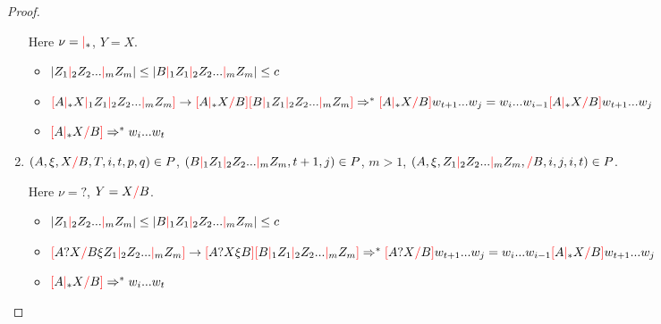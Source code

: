 \documentclass[12pt]{extarticle}
\theoremstyle{definition} \newtheorem{defn}{Definition}
\theoremstyle{definition} \newtheorem{prop}{Proposition}
\newcommand{\rc}{\textcolor{red}{/}}
\newcommand{\mc}{\textcolor{red}{|}}
\newcommand{\lb}{\textcolor{red}{[}}
\newcommand{\rb}{\textcolor{red}{]}}
\begin{document}
\begin{proof}
\begin{enumerate}
        Here $\nu = \mc_*$, $Y = X$.
        \begin{itemize}
            \item $|Z_1 \mc_2 Z_2 ... \mc_m Z_m| \leq |B \mc_1 Z_1 \mc_2 Z_2 ... \mc_m Z_m| \leq c$
            \item $
                \lb A \mc_* X \mc_1 Z_1 \mc_2 Z_2 ... \mc_m Z_m \rb
                \rightarrow
                \lb A \mc_* X \rc B \rb \lb B \mc_1 Z_1 \mc_2 Z_2 ... \mc_m Z_m \rb
                \\
                \Rightarrow^* \lb A \mc_* X \rc B \rb w_{t + 1} ... w_j
                = w_i ... w_{i - 1} \lb A \mc_* X \rc B \rb w_{t + 1} ... w_j
                $
            \item $\lb A \mc_* X \rc B \rb \Rightarrow^* w_i ... w_t$
        \end{itemize}

    \item $(A, \xi, X \rc B, T, i, t, p, q) \in P$,
        $(B \mc_1 Z_1 \mc_2 Z_2 ... \mc_m Z_m, t + 1, j) \in P$,
        $m > 1$,
        $(A, \xi, Z_1 \mc_2 Z_2 ... \mc_m Z_m, \rc B, i, j, i, t) \in P$.

        Here $\nu = ?$, $Y = X \rc B$.
        \begin{itemize}
            \item $|Z_1 \mc_2 Z_2 ... \mc_m Z_m| \leq |B \mc_1 Z_1 \mc_2 Z_2 ... \mc_m Z_m| \leq c$
            \item $
                \lb A ? X \rc B \xi Z_1 \mc_2 Z_2 ... \mc_m Z_m \rb
                \rightarrow
                \lb A ? X \xi B \rb \lb B \mc_1 Z_1 \mc_2 Z_2 ... \mc_m Z_m \rb
                \\
                \Rightarrow^* \lb A ? X \rc B \rb w_{t + 1} ... w_j
                = w_i ... w_{i - 1} \lb A \mc_* X \rc B \rb w_{t + 1} ... w_j
                $
            \item $\lb A \mc_* X \rc B \rb \Rightarrow^* w_i ... w_t$
        \end{itemize}




\end{enumerate}
\end{proof}
\end{document}
